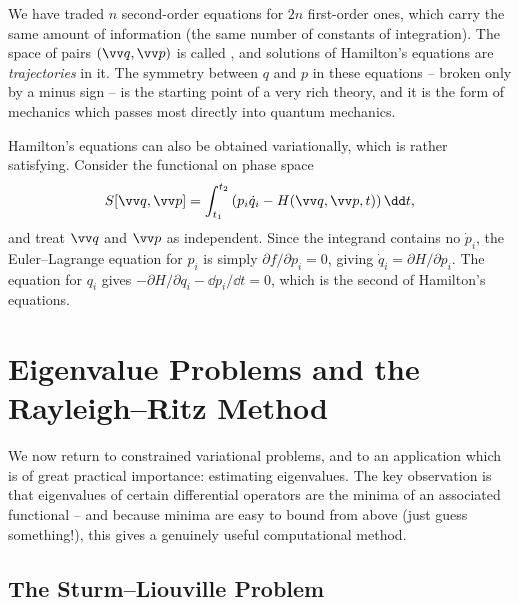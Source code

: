 \documentclass[a4paper]{scrartcl}
\begin{document}
We have traded $n$ second-order equations for $2n$ first-order ones, which carry the same amount of information (the same number of constants of integration). The space of pairs $(\vv q, \vv p)$ is called , and solutions of Hamilton's equations are \emph{trajectories} in it. The symmetry between $q$ and $p$ in these equations -- broken only by a minus sign -- is the starting point of a very rich theory, and it is the form of mechanics which passes most directly into quantum mechanics.

\begin{remark}
	Hamilton's equations can also be obtained variationally, which is rather satisfying. Consider the functional on phase space
	$$
	S[\vv q, \vv p] = \int_{t_1}^{t_2}\left(p_i \dot q_i - H(\vv q, \vv p, t)\right)\dd t,
	$$
	and treat $\vv q$ and $\vv p$ as independent. Since the integrand contains no $\dot p_i$, the Euler--Lagrange equation for $p_i$ is simply $\partial f/\partial p_i = 0$, giving $\dot q_i = \partial H/\partial p_i$. The equation for $q_i$ gives $-\partial H/\partial q_i - \dd p_i/\dd t = 0$, which is the second of Hamilton's equations.
\end{remark}

\section{Eigenvalue Problems and the Rayleigh--Ritz Method}\label{sec:rayleigh}

We now return to constrained variational problems, and to an application which is of great practical importance: estimating eigenvalues. The key observation is that eigenvalues of certain differential operators are the minima of an associated functional -- and because minima are easy to bound from above (just guess something!), this gives a genuinely useful computational method.

\subsection{The Sturm--Liouville Problem}
\end{document}
